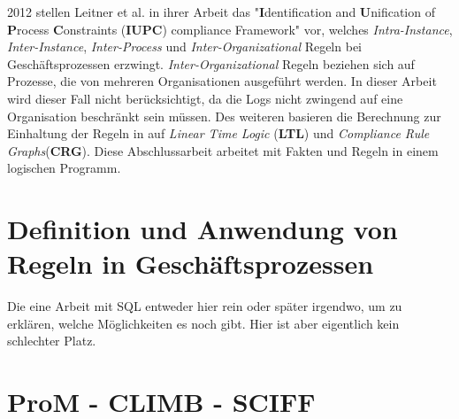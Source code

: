 2012 stellen Leitner et al. in ihrer Arbeit \cite{instance_spanning} das "\textbf{I}dentification and \textbf{U}nification of \textbf{P}rocess \textbf{C}onstraints (\textbf{IUPC}) compliance Framework" vor, welches \textit{Intra-Instance}, \textit{Inter-Instance}, \textit{Inter-Process} und \textit{Inter-Organizational} Regeln bei Geschäftsprozessen erzwingt. \textit{Inter-Organizational} Regeln beziehen sich auf Prozesse, die von mehreren Organisationen ausgeführt werden. In dieser Arbeit wird dieser Fall nicht berücksichtigt, da die Logs nicht zwingend auf eine Organisation beschränkt sein müssen. Des weiteren basieren die Berechnung zur Einhaltung der Regeln in \cite{instance_spanning} auf \textit{Linear Time Logic} (\textbf{LTL}) und \textit{Compliance Rule Graphs}(\textbf{CRG}). Diese Abschlussarbeit arbeitet mit Fakten und Regeln in einem logischen Programm.

\section{Definition und Anwendung von Regeln in Geschäftsprozessen}
Die eine Arbeit mit SQL entweder hier rein oder später irgendwo, um zu erklären, welche Möglichkeiten es noch gibt. Hier ist aber eigentlich kein schlechter Platz.\cite{rulelanguage}

\section{ProM - CLIMB - SCIFF}
\cite{SCIFF} \cite{SCIFFPaper} \cite{SCIFF2} \cite{SCIFF3}



